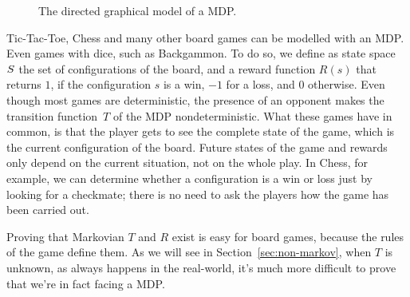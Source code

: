 \begin{figure}
	\centering
	\caption{The directed graphical model of a MDP.}
	\label{fig:mdp}
\end{figure}

\begin{example}
	\label{ex:board-games}
	Tic-Tac-Toe, Chess and many other board games can be modelled with an MDP.
	Even games with dice, such as Backgammon. To do so, we define as state
	space~$S$ the set of configurations of the board, and a reward
	function $R(s)$ that returns $1$, if the configuration $s$ is a win, $-1$
	for a loss, and 0 otherwise. Even though most games are deterministic, the
	presence of an opponent makes the transition function~$T$ of the MDP
	nondeterministic.  What these games have in common, is that the player gets
	to see the complete state of the game, which is the current configuration of
	the board. Future states of the game and rewards only depend on the current
	situation, not on the whole play. In Chess, for example, we can determine
	whether a configuration is a win or loss just by looking for a checkmate;
	there is no need to ask the players how the game has been carried out.

	Proving that Markovian $T$ and $R$ exist is easy for board games, because
	the rules of the game define them. As we will see in
	Section~\ref{sec:non-markov}, when $T$ is unknown, as always happens in the
	real-world, it's much more difficult to prove that we're in fact facing a
	MDP.
\end{example}


